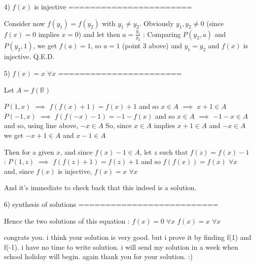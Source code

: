 \begin{solution}
4) $ f(x)$ is injective
=======================

Consider now $ f(y_1)=f(y_2)$ with $ y_1\neq y_2$. Obviously $ y_1,y_2\neq 0$ (since $ f(x)=0$ implies $ x=0$) and let then $ a=\frac{y_1}{y_2}$ :
Comparing  $ P(y_2,a)$ and $ P(y_2,1)$, we get $ f(a)=1$, so $ a=1$ (point 3 above) and $ y_1=y_2$ and $ f(x)$ is injective.
Q.E.D.

5) $ f(x)=x$ $ \forall x$
=======================

Let $ A=f(\mathbb R)$

$ P(1,x)$ $ \implies$ $ f(f(x)+1)=f(x)+1$ and so $ x\in A$ $ \implies$ $ x+1\in A$
$ P(-1,x)$ $ \implies$ $ f(f(-x)-1)=-1-f(x)$ and so $ x\in A$ $ \implies$ $ -1-x\in A$ and so, using line above, $ -x\in A$
So, since $ x\in A$ implies $ x+1\in A$ and $ -x\in A$ we get $ -x+1\in A$ and $ x-1\in A$

Then for a given $ x$, and since $ f(x)-1\in A$, let $ z$ such that $ f(z)=f(x)-1$ :
$ P(1,z)$ $ \implies$ $ f(f(z)+1)=f(z)+1$ and so $ f(f(x))=f(x)$ $ \forall x$ and, since $ f(x)$ is injective, $ f(x)=x$ $ \forall 
x$

And it's immediate to check back that this indeed is a solution.

6) synthesis of solutions
==========================

Hence the two solutions of this equation :
$ f(x)=0$ $ \forall x$
$ f(x)=x$ $ \forall x$
\end{solution}



\begin{solution}
	congrats you. i think your solution is very good. but  i prove it by finding f(1) and f(-1). i have no time to write solution. i will send my solution in a week when school holiday will begin. again thank you  for your solution. :)
\end{solution}



